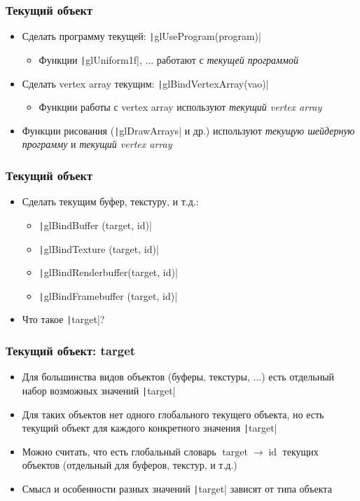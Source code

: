 \documentclass[10pt]{beamer}
\begin{document}
\begin{frame}[fragile]
\frametitle{Текущий объект}
\begin{itemize}
\item Сделать программу текущей: \texttt|glUseProgram(program)|
\begin{itemize}
\item Функции \texttt|glUniform1f|, ... работают с \textit{текущей программой}
\end{itemize}
\pause
\item Сделать vertex array текущим: \texttt|glBindVertexArray(vao)|
\begin{itemize}
\item Функции работы с vertex array используют \textit{текущий vertex array}
\end{itemize}
\pause
\item Функции рисования (\texttt|glDrawArrays| и др.) используют \textit{текущую шейдерную программу} и \textit{текущий vertex array}
\end{itemize}
\end{frame}

\begin{frame}[fragile]
\frametitle{Текущий объект}
\begin{itemize}
\item Сделать текущим буфер, текстуру, и т.д.:
\begin{itemize}
\item \texttt|glBindBuffer      (target, id)|
\item \texttt|glBindTexture     (target, id)|
\item \texttt|glBindRenderbuffer(target, id)|
\item \texttt|glBindFramebuffer (target, id)|
\end{itemize}
\pause
\item Что такое \texttt|target|?
\end{itemize}
\end{frame}

\begin{frame}[fragile]
\frametitle{Текущий объект: target}
\begin{itemize}
\item Для большинства видов объектов (буферы, текстуры, ...) есть отдельный набор возможных значений \texttt|target|
\pause
\item Для таких объектов нет одного глобального текущего объекта, но есть текущий объект для каждого конкретного значения \texttt|target|
\pause
\item Можно считать, что есть глобальный словарь \begin{math}\operatorname{target} \rightarrow \operatorname{id}\end{math} текущих объектов (отдельный для буферов, текстур, и т.д.)
\pause
\item Смысл и особенности разных значений \texttt|target| зависят от типа объекта
\end{itemize}
\end{frame}
\end{document}
